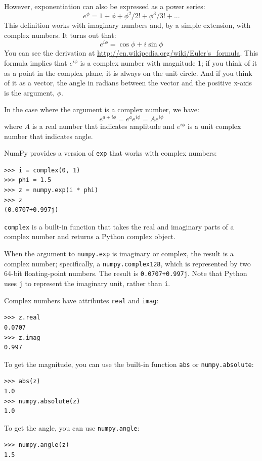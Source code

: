 \documentclass[12pt]{book}
\begin{document}
However, exponentiation can also be expressed as a power series:
%
\[ e^\phi = 1 + \phi + \phi^2/2! + \phi^3/3! + ... \]
%
This definition works with imaginary numbers and, by a simple
extension, with complex numbers.  It turns out that:
%
\[ e^{i\phi} = \cos \phi + i \sin \phi \]
%
You can see the derivation at
\url{http://en.wikipedia.org/wiki/Euler's_formula}.  This formula
implies that $e^{i\phi}$ is a complex number with magnitude 1; if you
think of it as a point in the complex plane, it is always on the unit
circle.  And if you think of it as a vector, the angle in radians
between the vector and the positive x-axis is the argument, $\phi$.

In the case where the argument is a complex number, we have:
%
\[ e^{a + i\phi} = e^a e^{i\phi} = A e^{i\phi} \]
%
where $A$ is a real number that indicates amplitude and
$e^{i\phi}$ is a unit complex number that indicates angle.

NumPy provides a version of {\tt exp} that works with complex numbers:

\begin{verbatim}
>>> i = complex(0, 1)
>>> phi = 1.5
>>> z = numpy.exp(i * phi)
>>> z
(0.0707+0.997j)
\end{verbatim}

{\tt complex} is a built-in function that takes the real and
imaginary parts of a complex number and returns a Python
complex object.

When the argument to {\tt numpy.exp} is imaginary or complex, the
result is a complex number; specifically, a {\tt numpy.complex128},
which is represented by two 64-bit floating-point numbers.  The result
is {\tt 0.0707+0.997j}.  Note that Python uses {\tt j} to represent
the imaginary unit, rather than {\tt i}.

Complex numbers have attributes {\tt real} and {\tt imag}:

\begin{verbatim}
>>> z.real
0.0707
>>> z.imag
0.997
\end{verbatim}

To get the magnitude, you can use the built-in function {\tt abs}
or {\tt numpy.absolute}:

\begin{verbatim}
>>> abs(z)
1.0
>>> numpy.absolute(z)
1.0
\end{verbatim}

To get the angle, you can use {\tt numpy.angle}:

\begin{verbatim}
>>> numpy.angle(z)
1.5
\end{verbatim}
\end{document}
